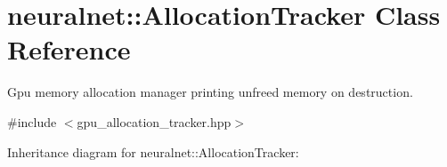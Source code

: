 \hypertarget{classneuralnet_1_1AllocationTracker}{}\section{neuralnet\+:\+:Allocation\+Tracker Class Reference}
\label{classneuralnet_1_1AllocationTracker}


Gpu memory allocation manager printing unfreed memory on destruction.  




{\ttfamily \#include $<$gpu\+\_\+allocation\+\_\+tracker.\+hpp$>$}



Inheritance diagram for neuralnet\+:\+:Allocation\+Tracker\+:
